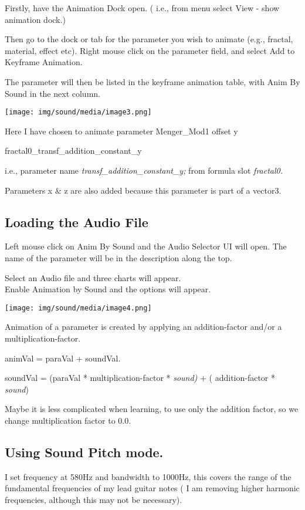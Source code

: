 Firstly, have the Animation Dock open. ( i.e., from menu select View -
show animation dock.)

Then go to the dock or tab for the parameter you wish to animate (e.g.,
fractal, material, effect etc). Right mouse click on the parameter
field, and select Add to Keyframe Animation.

The parameter will then be listed in the keyframe animation table, with
Anim By Sound in the next column.

\texttt{[image: img/sound/media/image3.png]}

Here I have chosen to animate parameter Menger\_Mod1 offset y

fractal0\_transf\_addition\_constant\_y

i.e., parameter name \emph{transf\_addition\_constant\_y;} from formula
slot \emph{fractal0.}

Parameters x \& z are also added because this parameter is part of a
vector3.

\subsection{Loading the Audio File}\label{loading-the-audio-file}

Left mouse click on Anim By Sound and the Audio Selector UI will open.
The name of the parameter will be in the description along the top.

Select an Audio file and three charts will appear.\\
Enable Animation by Sound and the options will appear.

\texttt{[image: img/sound/media/image4.png]}

Animation of a parameter is created by applying an addition-factor
and/or a multiplication-factor.

animVal = paraVal + soundVal.

soundVal = (paraVal * multiplication-factor * \emph{sound)} + (
addition-factor * \emph{sound})

Maybe it is less complicated when learning, to use only the addition factor,
so we change multiplication factor to 0.0.

\subsection{Using Sound Pitch mode.}\label{using-sound-pitch-mode.}

I set frequency at 580Hz and bandwidth to 1000Hz, this covers the range
of the fundamental frequencies of my lead guitar notes ( I am removing
higher harmonic frequencies, although this may not be necessary).

